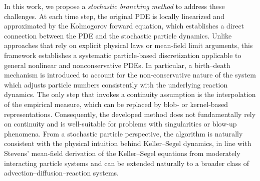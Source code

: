 \documentclass[preprint,12pt]{elsarticle}
\theoremstyle{definition}
\theoremstyle{remark}
\begin{document}
In this work, we propose a \textit{stochastic branching method} to address these challenges. 
At each time step, the original PDE is locally linearized and approximated by the Kolmogorov forward equation, which establishes a direct connection between the PDE and the stochastic particle dynamics.  Unlike approaches that rely on explicit physical laws or mean-field limit arguments, this framework establishes a systematic particle-based discretization applicable to general nonlinear and nonconservative PDEs. 
In particular, a birth–death mechanism is introduced to account for the non-conservative nature of the system which adjusts particle numbers consistently with the underlying reaction dynamics.  
The only step that invokes a continuity assumption is the interpolation of the empirical measure, which can be replaced by blob- or kernel-based representations. Consequently, the developed method does not fundamentally rely on continuity and is well-suitable for problems with singularities or blow-up phenomena. From a stochastic particle perspective, the algorithm is naturally consistent with the physical intuition behind Keller–Segel dynamics, in line with Stevens’ mean-field derivation of the Keller–Segel equations from moderately interacting particle systems \cite{Stevens_SIAM_2000} and can be extended naturally to a broader class of advection–diffusion–reaction systems.
\end{document}
